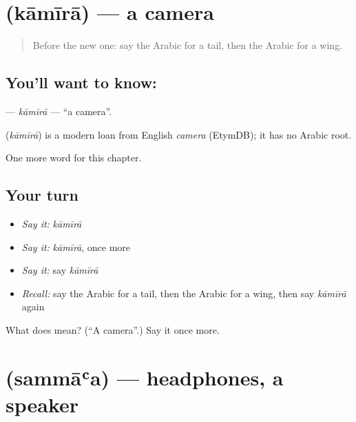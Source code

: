 \section[\texorpdfstring{\ar{كاميرا} (kāmīrā)}{كاميرا (kāmīrā)}]{ (kāmīrā) — a camera}

\label{lesson:AR-C217-kamira}



\begin{quote}
Before the new one: say the Arabic for a tail, then the Arabic for a wing.
\end{quote}

\subsection*{You'll want to know: }
\textbf{} — \emph{kāmīrā} — \textquotedblleft{}a camera\textquotedblright{}.

\begin{cousinweb}
\textbf{} (\emph{kāmīrā}) is a modern loan from English \emph{camera} (EtymDB); it has no Arabic root.
\end{cousinweb}

\begin{grammarlens}[title={What you've built}]
One more word for this chapter.
\end{grammarlens}

\subsection*{Your turn}
\begin{itemize}
\raggedright
  \item \emph{Say it:} \emph{kāmīrā}
  \item \emph{Say it:} \emph{kāmīrā}, once more
  \item \emph{Say it:} say \emph{kāmīrā}
  \item \emph{Recall:} say the Arabic for a tail, then the Arabic for a wing, then say \emph{kāmīrā} again
\end{itemize}

\begin{tcolorbox}[breakable,colback=teal!4,colframe=teal!35!black,title={Before you move on}]
What does  mean? (\textquotedblleft{}A camera\textquotedblright{}.) Say it once more.
\end{tcolorbox}
\section[\texorpdfstring{\ar{سماعة} (sammāʿa)}{سماعة (sammāʿa)}]{ (sammāʿa) — headphones, a speaker}


